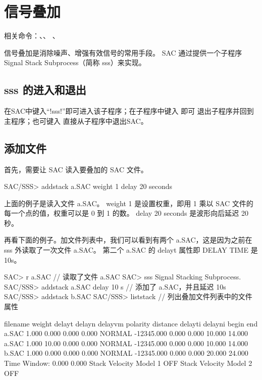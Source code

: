 \section{信号叠加}
\label{sec:stack-traces}
相关命令：、、
、

信号叠加是消除噪声、增强有效信号的常用手段。
SAC 通过提供一个子程序 Signal Stack Subprocess（简称 sss）来实现。

\subsection{sss 的进入和退出}
在SAC中键入``!sss!''即可进入该子程序；在子程序中键入  即可
退出子程序并回到主程序；也可键入  直接从子程序中退出SAC。

\subsection{添加文件}

首先，需要让 SAC 读入要叠加的 SAC 文件。

\begin{SACCode}
SAC/SSS> addstack a.SAC weight 1 delay 20 seconds
\end{SACCode}

上面的例子是读入文件 a.SAC。
weight 1 是设置权重，即用 1 乘以 SAC 文件的每一个点的值，权重可以是 0 到 1 的数。
delay 20 seconds 是波形向后延迟 20 秒。

再看下面的例子。加文件列表中，我们可以看到有两个 a.SAC，这是因为之前在 sss 外读取了一次文件 a.SAC。
第二个 a.SAC 的 delayt 属性即 DELAY TIME 是 10s。

\begin{SACCode}
SAC> r a.SAC    // 读取了文件 a.SAC
SAC> sss
Signal Stacking Subprocess.
SAC/SSS> addstack a.SAC delay 10 s    // 添加了 a.SAC，并且延迟 10s
SAC/SSS> addstack b.SAC
SAC/SSS> liststack    // 列出叠加文件列表中的文件属性

 filename  weight      delayt      delayn     delayvm   polarity   distance
                           delayti     delayni      begin       end
 a.SAC         1.000       0.000       0.000       0.000   NORMAL   -12345.000
                             0.000       0.000      10.000      14.000
 a.SAC         1.000       10.00       0.000       0.000   NORMAL   -12345.000
                             0.000       0.000      10.000      14.000
 b.SAC         1.000       0.000       0.000       0.000   NORMAL   -12345.000
                             0.000       0.000      20.000      24.000
 Time Window:       0.000       0.000
 Stack Velocity Model 1 OFF
 Stack Velocity Model 2 OFF
\end{SACCode}

